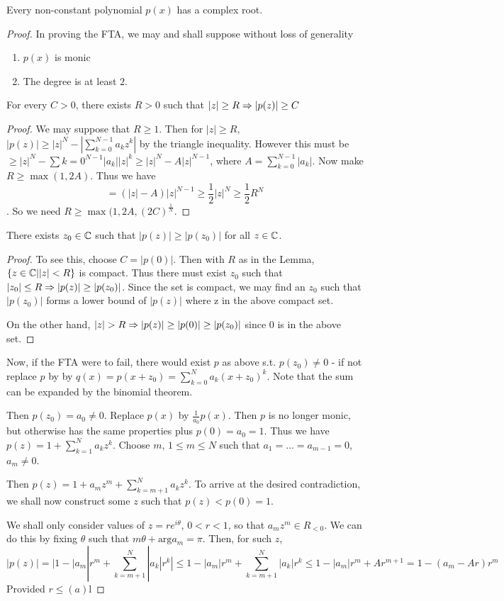 \begin{thrm}
Every non-constant polynomial $p(x)$ has a complex root.
\begin{proof}
In proving the FTA, we may and shall suppose without loss of generality
\begin{enumerate}
\item $p(x)$ is monic
\item The degree is at least $2$. 
\end{enumerate}
\begin{lemma}
For every $C>0$, there exists $R>0$ such that $|z|\geq R \Rightarrow |p(z)| \geq C$
\begin{proof}
We may suppose that $R\geq 1$. Then for $|z|\geq R$, $|p(z)|\geq |z|^N - \left| \sum\limits_{k=0}^{N-1} a_k z^k \right|$ by the triangle inequality. However this must be $\geq |z|^N - \sum\limits{k=0}^{N-1} |a_k||z|^k \geq |z|^N - A|z|^{N-1}$, where $A=\sum\limits_{k=0}^{N-1} |a_k|$. Now make $R\geq \max(1,2A)$. Thus we have 
\[ = (|z|-A)|z|^{N-1} \geq \frac{1}{2} |z|^N \geq \frac{1}{2}R^N\]. So we need $R\geq \max(1,2A,(2C)^{\frac{1}{N}}$.
\end{proof}
\end{lemma}
\begin{cor}
There exists $z_0\in \mathbb{C}$ such that $|p(z)|\geq |p(z_0)|$ for all $z\in \mathbb{C}$. 
\begin{proof}To see this, choose $C=|p(0)|$. Then with $R$ as in the Lemma, $\{z\in \mathbb{C} | |z|<R\}$ is compact. Thus there must exist $z_0$ such that $|z_0|\leq R \Rightarrow |p(z)|\geq |p(z_0)|$. Since   the set is compact, we may find an $z_0$ such that $|p(z_0)|$ forms a lower bound of $|p(z)|$ where z in the above compact set.\par 
On the other hand, $|z|>R\so |p(z)|\geq|p(0)|\geq |p(z_0)|$ since $0$ is in the above set.
\end{proof}
\end{cor}
Now, if the FTA were to fail, there would exist $p$ as above s.t. $p(z_0) \neq 0$ - if not replace $p$ by by $q(x) = p(x+z_0) = \sum_{k=0}^N a_k(x+z_0)^k$. Note that the sum can be expanded by the binomial theorem. \par 
Then $p(z_0) = a_0 \neq 0$. Replace $p(x)$ by $\frac{1}{a_0}p(x)$. Then $p$ is no longer monic, but otherwise has the same properties plus $p(0) = a_0 = 1$. Thus we have $p(z) = 1+\sum_{k=1}^N a_k z^k$. Choose $m$, $1\leq m \leq N$ such that $a_1=\ldots=a_{m-1}=0$, $a_m\neq 0$. \par
Then $p(z) = 1 + a_mz^m + \sum_{k=m+1}^N a_k z^k$. To arrive at the desired contradiction, we shall now construct some $z$ such that $p(z)<p(0)=1$.\par 
We shall only consider values of $z=re^{i\theta}$, $0<r<1$, so that $a_mz^m \in R_{<0}$. We can do this by fixing $\theta$ such that $m\theta + \text{arg} a_m = \pi$. Then, for such $z$,
\[ |p(z)| = | 1-|a_m|r^m + \sum\limits_{k=m+1}^N |a_k| r^k| \leq 1-|a_m|r^m + \sum\limits_{k=m+1}^N |a_k| r^k \leq 1-|a_m|r^m + Ar^{m+1} = 1 - (a_m - Ar)r^m \] 
Provided $r\leq (a)$l
\end{proof}
\end{thrm}
